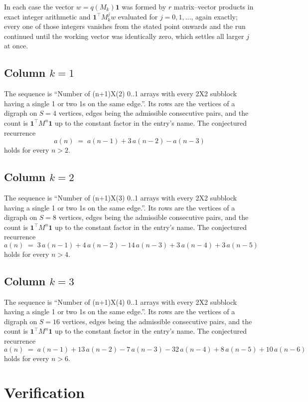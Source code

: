 \documentclass[11pt,a4paper]{article}
\theoremstyle{plain}
\theoremstyle{definition}
\begin{document}
In each case the vector $w=q(M_k)\mathbf{1}$ was formed by $r$ matrix--vector products in
exact integer arithmetic and $\mathbf{1}^{\!\top}M_k^{j}w$ evaluated for $j=0,1,\dots$,
again exactly; every one of those integers vanishes from the stated point onwards and the run
continued until the working vector was identically zero, which settles all larger $j$ at once.

\subsection*{Column $k=1$}
The sequence is ``Number of (n+1)X(2) 0..1 arrays with every 2X2 subblock having a single 1 or two 1s on the same edge.''. Its rows are the vertices of a digraph on
$S=4$ vertices, edges being the admissible consecutive pairs, and the count is
$\mathbf{1}^{\!\top}M^{n}\mathbf{1}$ up to the constant factor in the entry's name.
The conjectured recurrence
\[
a(n)\;=\;a(n-1) + 3\,a(n-2) - a(n-3)
\]
holds for every $n>2$.

\subsection*{Column $k=2$}
The sequence is ``Number of (n+1)X(3) 0..1 arrays with every 2X2 subblock having a single 1 or two 1s on the same edge.''. Its rows are the vertices of a digraph on
$S=8$ vertices, edges being the admissible consecutive pairs, and the count is
$\mathbf{1}^{\!\top}M^{n}\mathbf{1}$ up to the constant factor in the entry's name.
The conjectured recurrence
\[
a(n)\;=\;3\,a(n-1) + 4\,a(n-2) - 14\,a(n-3) + 3\,a(n-4) + 3\,a(n-5)
\]
holds for every $n>4$.

\subsection*{Column $k=3$}
The sequence is ``Number of (n+1)X(4) 0..1 arrays with every 2X2 subblock having a single 1 or two 1s on the same edge.''. Its rows are the vertices of a digraph on
$S=16$ vertices, edges being the admissible consecutive pairs, and the count is
$\mathbf{1}^{\!\top}M^{n}\mathbf{1}$ up to the constant factor in the entry's name.
The conjectured recurrence
\[
a(n)\;=\;a(n-1) + 13\,a(n-2) - 7\,a(n-3) - 32\,a(n-4) + 8\,a(n-5) + 10\,a(n-6)
\]
holds for every $n>6$.

\section{Verification}
\end{document}
